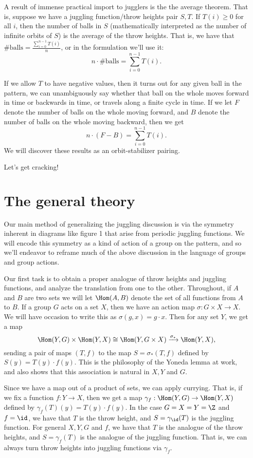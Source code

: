 \documentclass[12nt]{article}
\theoremstyle{plain}
\begin{document}
A result of immense practical import to jugglers is the the average theorem. That is, suppose we have a juggling function/throw heights pair $S, T$. If $T(i) \geq 0$ for all $i$, then the number of balls in $S$ (mathematically interpreted as the number of infinite orbits of $S$) is the average of the throw heights. That is, we have that $\# \text{balls} = \frac{\sum \limits_{i = 0}^{n-1} T(i)}{n} $, or in the formulation we'll use it:
\[
n \cdot \# \text{balls} = \sum \limits_{i=0}^{n-1} T(i).
\]

If we allow $T$ to have negative values, then it turns out for any given ball in the pattern, we can unambiguously say whether that ball on the whole moves forward in time or backwards in time, or travels along a finite cycle in time. If we let $F$ denote the number of balls on the whole moving forward, and $B$ denote the number of balls on the whole moving backward, then we get
\[
n \cdot (F - B) = \sum \limits_{i=0}^{n-1} T(i).
\]
We will discover these results as an orbit-stabilizer pairing.


Let's get cracking!

\section{The general theory}
Our main method of generalizing the juggling discussion is via the symmetry inherent in diagrams like figure 1 that arise from periodic juggling functions. We will encode this symmetry as a kind of action of a group on the pattern, and so we'll endeavor to reframe much of the above discussion in the language of groups and group actions.

Our first task is to obtain a proper analogue of throw heights and juggling functions, and analyze the translation from one to the other. Throughout, if $A$ and $B$ are two sets we will let $\Hom(A, B)$ denote the set of all functions from $A$ to $B$. If a group $G$ acts on a set $X$, then we have an action map $\sigma : G \times X \to X$. We will have occasion to write this as $\sigma(g, x) = g \cdot x$. Then for any set $Y$, we get a map
\[
\Hom(Y, G) \times \Hom(Y, X) \cong \Hom(Y, G \times X) \xrightarrow{\sigma_*} \Hom(Y, X),
\] sending a pair of maps $(T, f)$ to the map $S = \sigma_*(T, f)$ defined by $S(y) = T(y) \cdot f(y)$. This is the philosophy of the Yoneda lemma at work, and also shows that this association is natural in $X, Y$ and $G$. 

Since we have a map out of a product of sets, we can apply currying. That is, if we fix a function $f : Y \to X$, then we get a map $\gamma_f : \Hom(Y, G) \to \Hom(Y, X)$ defined by $\gamma_f(T)(y) = T(y) \cdot f(y)$. In the case $G = X = Y = \Z$ and $f = \id$, we have that $T$ is the throw height, and $S = \gamma_{\id}(T)$ is the juggling function. For general $X, Y, G$ and $f$, we have that $T$ is the analogue of the throw heights, and $S = \gamma_f(T)$ is the analogue of the juggling function. That is, we can always turn throw heights into juggling functions via $\gamma_f$. 
\end{document}
